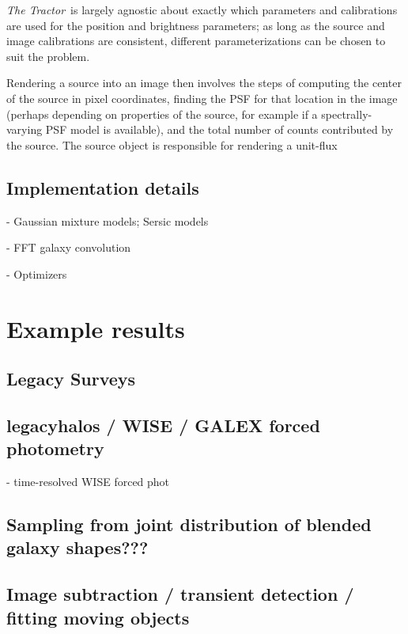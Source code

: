 \documentclass[linenumbers]{aastex631}
\newcommand{\thetractor}{\emph{The Tractor}}
\begin{document}
\thetractor\ is largely agnostic about exactly which parameters and
calibrations are used for the position and brightness parameters; as
long as the source and image calibrations are consistent, different
parameterizations can be chosen to suit the problem.


Rendering a source into an image then involves the steps of computing
the center of the source in pixel coordinates, finding the PSF for
that location in the image (perhaps depending on properties of the
source, for example if a spectrally-varying PSF model is available),
and the total number of counts contributed by the source.  The source
object is responsible for rendering a unit-flux




\subsection{Implementation details}

- Gaussian mixture models; Sersic models

- FFT galaxy convolution

- Optimizers

\section{Example results}



\subsection{Legacy Surveys}

\subsection{legacyhalos / WISE / GALEX forced photometry}

- time-resolved WISE forced phot

\subsection{Sampling from joint distribution of blended galaxy shapes???}

\subsection{Image subtraction / transient detection / fitting moving objects}
\end{document}
